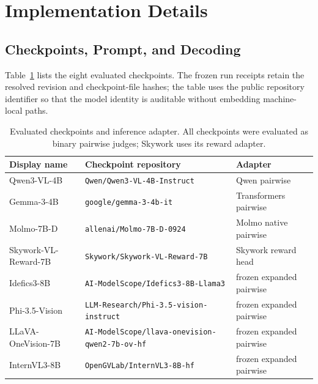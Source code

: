 \section{Implementation Details}
\label{app:implementation-details}
\FloatBarrier

\subsection{Checkpoints, Prompt, and Decoding}
\label{app:models-and-protocol}

Table~\ref{tab:checkpoints} lists the eight evaluated checkpoints. The frozen
run receipts retain the resolved revision and checkpoint-file hashes; the table
uses the public repository identifier so that the model identity is auditable
without embedding machine-local paths.

\begin{table}[t]
\centering
\scriptsize
\caption{Evaluated checkpoints and inference adapter. All checkpoints were
evaluated as binary pairwise judges; Skywork uses its reward adapter.}
\label{tab:checkpoints}
\setlength{\tabcolsep}{3pt}
\begin{tabular}{p{}p{}p{}}
\toprule
Display name & Checkpoint repository & Adapter \\
\midrule
Qwen3-VL-4B & \texttt{Qwen/Qwen3-VL-4B-Instruct} & Qwen pairwise \\
Gemma-3-4B & \texttt{google/gemma-3-4b-it} & Transformers pairwise \\
Molmo-7B-D & \texttt{allenai/Molmo-7B-D-0924} & Molmo native pairwise \\
Skywork-VL-Reward-7B & \texttt{Skywork/Skywork-VL-Reward-7B} & Skywork reward head \\
Idefics3-8B & \texttt{AI-ModelScope/Idefics3-8B-Llama3} & frozen expanded pairwise \\
Phi-3.5-Vision & \texttt{LLM-Research/Phi-3.5-vision-instruct} & frozen expanded pairwise \\
LLaVA-OneVision-7B & \texttt{AI-ModelScope/llava-onevision-}\newline\texttt{qwen2-7b-ov-hf} & frozen expanded pairwise \\
InternVL3-8B & \texttt{OpenGVLab/InternVL3-8B-hf} & frozen expanded pairwise \\
\bottomrule
\end{tabular}
\end{table}


